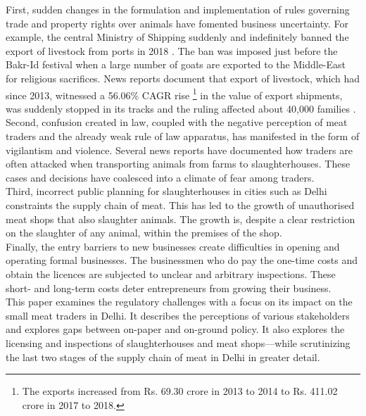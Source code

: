 \documentclass[a4paper, 12pt]{article}
\begin{document}
First, sudden changes in the formulation and implementation of rules governing trade and property rights over animals have fomented business uncertainty. For example, the central Ministry of Shipping suddenly and indefinitely banned the export of livestock from ports in 2018 \parencite{kateshiyanews}. The ban was imposed just before the Bakr-Id festival when a large number of goats are exported to the Middle-East for religious sacrifices. News reports document that export of livestock, which had since 2013, witnessed a 56.06\% CAGR rise \footnote { The exports increased from Rs. 69.30 crore in 2013 to 2014 to Rs. 411.02 crore in 2017 to 2018.} in the value of export shipments, was suddenly stopped in its tracks and the ruling affected about 40,000 families \parencite{hindunews}. \\

Second, confusion created in law, coupled with the negative perception of meat traders and the already weak rule of law apparatus, has manifested in the form of vigilantism and violence. Several news reports have documented how traders are often attacked when transporting animals from farms to slaughterhouses. These cases and decisions have coalesced into a climate of fear among traders.\\

Third, incorrect public planning for slaughterhouses in cities such as Delhi constraints the supply chain of meat. This has led to the growth of unauthorised meat shops that also slaughter animals. The growth is, despite a clear restriction on the slaughter of any animal, within the premises of the shop. \\

Finally, the entry barriers to new businesses create difficulties in opening and operating formal businesses. The businessmen who do pay the one-time costs and obtain the licences are subjected to unclear and arbitrary inspections. These short- and long-term costs deter entrepreneurs from growing their business. \\

This paper examines the regulatory challenges with a focus on its impact on the small meat traders in Delhi. It describes the perceptions of various stakeholders and explores gaps between on-paper and on-ground policy. It also explores the licensing and inspections of slaughterhouses and meat shops—while scrutinizing the last two stages of the supply chain of meat in Delhi in greater detail.\\
\end{document}
